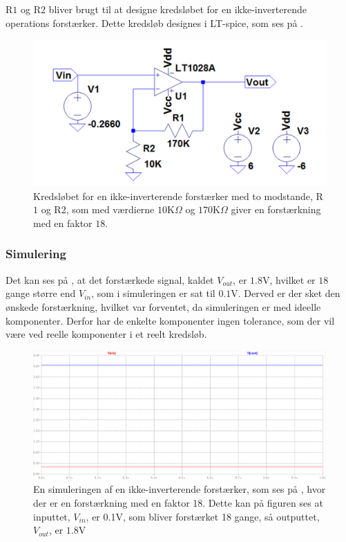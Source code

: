 R$1$ og R$2$ bliver brugt til at designe kredsløbet for en ikke-inverterende operations forstærker. Dette kredsløb designes i LT-spice, som ses på . 
\begin{figure}[H]
\centering
\includegraphics[scale=0.5]{figures/cProblemloesning/Forstaerker_faktor18.PNG}
\caption{Kredsløbet for en ikke-inverterende forstærker med to modstande, R$1$ og R$2$, som med værdierne $10$K$\Omega$ og $170$K$\Omega$ giver en forstærkning med en faktor $18$.}
\label{fig:Forstaerker_faktor18}
\end{figure} 

\subsubsection{Simulering}
Det kan ses på , at det forstærkede signal, kaldet $V_{out}$, er $1.8$V, hvilket er $18$ gange større end $V_{in}$, som i simuleringen er sat til $0.1$V. Derved er der sket den ønskede forstærkning, hvilket var forventet, da simuleringen er med ideelle komponenter. Derfor har de enkelte komponenter ingen tolerance, som der vil være ved reelle komponenter i et reelt kredsløb. 

\begin{figure}[H]
\centering
\includegraphics[scale=0.5]{figures/cProblemloesning/Forstaerker_faktor18_simulering.PNG}
\caption{En simuleringen af en ikke-inverterende forstærker, som ses på , hvor der er en forstærkning med en faktor 18. Dette kan på figuren ses at inputtet, $V_{in}$, er 0.1V, som bliver forstærket 18 gange, så outputtet, $V_{out}$, er $1.8$V}
\label{fig:Forstaerker_faktor18_simulering}
\end{figure}

